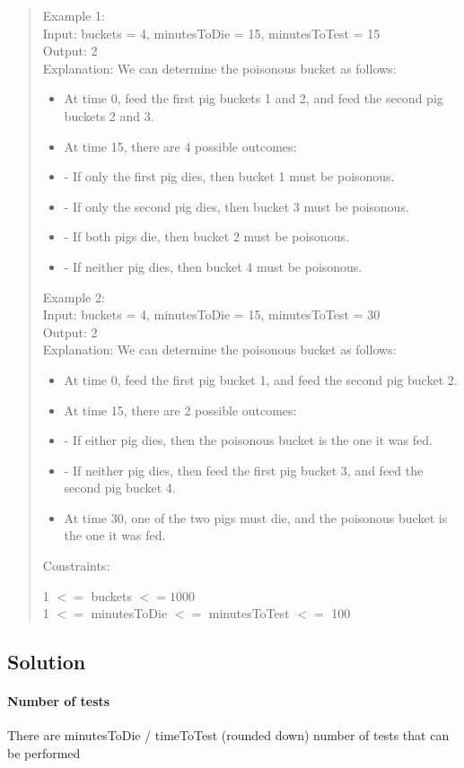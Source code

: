 \documentclass[a4,10pt]{article}
\begin{document}
\begin{quote}
Example 1:
\\
Input: buckets = 4, minutesToDie = 15, minutesToTest = 15\\
Output: 2\\
Explanation: We can determine the poisonous bucket as follows:
\begin{itemize}
\item At time 0, feed the first pig buckets 1 and 2, and feed the second pig buckets 2 and 3.
\item At time 15, there are 4 possible outcomes:
\item - If only the first pig dies, then bucket 1 must be poisonous.
\item - If only the second pig dies, then bucket 3 must be poisonous.
\item - If both pigs die, then bucket 2 must be poisonous.
\item - If neither pig dies, then bucket 4 must be poisonous.
\end{itemize}
Example 2:
\\
Input: buckets = 4, minutesToDie = 15, minutesToTest = 30\\
Output: 2\\
Explanation: We can determine the poisonous bucket as follows:
\begin{itemize}
\item At time 0, feed the first pig bucket 1, and feed the second pig bucket 2.
\item At time 15, there are 2 possible outcomes:
\item - If either pig dies, then the poisonous bucket is the one it was fed.
\item - If neither pig dies, then feed the first pig bucket 3, and feed the second pig bucket 4.
\item At time 30, one of the two pigs must die, and the poisonous bucket is the one it was fed.
\end{itemize}

Constraints:

    1 $<=$ buckets $<= 1000$\\
    1 $<=$ minutesToDie $<=$ minutesToTest $<=$ 100


\end{quote}
\subsection*{Solution}
\paragraph{Number of tests}
There are minutesToDie / timeToTest (rounded down) number of tests that can be performed
\end{document}
